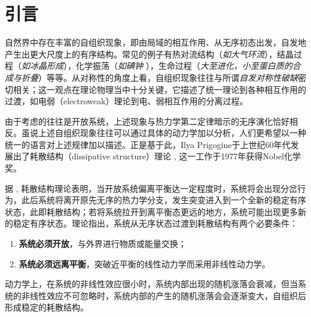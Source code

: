 \documentclass[aps,pre,12pt,preprint,%
	onecolumn,showpacs,showkeys,nofootinbib]{revtex4-1}
\begin{document}
\section{引言}
	自然界中存在丰富的自组织现象，即由局域的相互作用、从无序初态出发，自发地产生出更大尺度上的有序结构。常见的例子有热对流结构（\textit{如大气环流}），结晶过程（\textit{如冰晶形成}），化学振荡（\textit{如碘钟} \cite{lambert1984iodine}），生命过程（\textit{大至进化，小至蛋白质的合成与折叠}）等等。从对称性的角度上看，自组织现象往往与所谓\mbox{\textit{自发对称性破缺}}密切相关；这一观点在理论物理当中十分关键，它描述了统一理论到各种相互作用的过渡，如电弱（electroweak）理论到电、弱相互作用的分离过程。
	
	由于考虑的往往是开放系统，上述现象与热力学第二定律暗示的无序演化恰好相反。虽说上述自组织现象往往可以通过具体的动力学加以分析，人们更希望以一种统一的语言对上述规律加以描述。正是基于此，Ilya Prigogine于上世纪60年代发展出了耗散结构（dissipative structure）理论 \cite{prigogine1978time}, 这一工作于1977年获得Nobel化学奖。
	
	据 \cite{textbook}, 耗散结构理论表明，当开放系统偏离平衡达一定程度时，系统将会出现分岔行为，此后系统将离开原先无序的热力学分支，发生突变进入到一个全新的稳定有序状态，此即耗散结构；若将系统拉开到离平衡态更远的地方，系统可能出现更多新的稳定有序状态。理论指出，系统从无序状态过渡到耗散结构有两个必要条件：
	\begin{enumerate}[noitemsep,label=\arabic*.]
	\item \textbf{系统必须开放}，与外界进行物质或能量交换；
	\item \textbf{系统必须远离平衡}，突破近平衡的线性动力学而采用非线性动力学。
	\end{enumerate}
	
	动力学上，在系统的非线性效应很小时，系统内部出现的随机涨落会衰减，但当系统的非线性效应不可忽略时，系统内部的产生的随机涨落会会逐渐变大，自组织后形成稳定的耗散结构。
		
\end{document}
